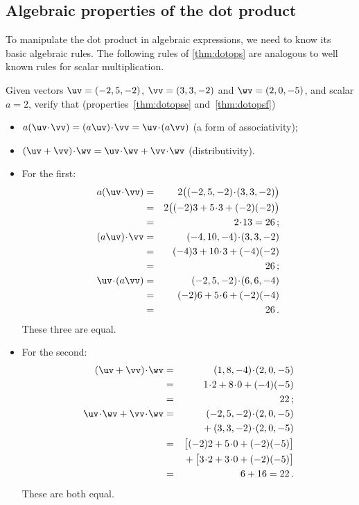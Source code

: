 \subsection{Algebraic properties of the dot product}
\label{sec:apdp}


To manipulate the dot product in algebraic expressions, we need to know its basic algebraic rules.
The following rules of \autoref{thm:dotops} are analogous to well known rules for scalar multiplication.


\begin{example} \label{eg:}
Given vectors \(\uv=(-2,5,-2)\), \(\vv=(3,3,-2)\) and \(\wv=(2,0,-5)\), and  scalar \(a=2\), verify that (properties~\ref{thm:dotopse} and~\ref{thm:dotopsf})
\begin{itemize}
\item \(a(\uv\cdot\vv)=(a\uv)\cdot\vv=\uv\cdot(a\vv)\) (a form of associativity);
\item \((\uv+\vv)\cdot\wv=\uv\cdot\wv+\vv\cdot\wv\) (distributivity).
\end{itemize}
\begin{solution} 
\begin{itemize}
\item For the first:
\begin{eqnarray*}
a(\uv\cdot\vv)&=&2\big((-2,5,-2)\cdot(3,3,-2)\big)
\\&=&2\big((-2)3+5\cdot3+(-2)(-2)\big)
\\&=&2\cdot13=26\,;
\\(a\uv)\cdot\vv&=&(-4,10,-4)\cdot(3,3,-2)
\\&=&(-4)3+10\cdot3+(-4)(-2)
\\&=&26\,;
\\\uv\cdot(a\vv)&=&(-2,5,-2)\cdot(6,6,-4)
\\&=&(-2)6+5\cdot6+(-2)(-4)
\\&=&26\,.
\end{eqnarray*}
These three are equal.

\item For the second:
\begin{eqnarray*}
(\uv+\vv)\cdot\wv&=&(1,8,-4)\cdot(2,0,-5)
\\&=&1\cdot2+8\cdot0+(-4)(-5)
\\&=&22\,;
\\\uv\cdot\wv+\vv\cdot\wv&=&
(-2,5,-2)\cdot(2,0,-5)
\\&&{}
+(3,3,-2)\cdot(2,0,-5)
\\&=&\big[(-2)2+5\cdot0+(-2)(-5)\big]
\\&&{}
+\big[3\cdot2+3\cdot0+(-2)(-5)\big]
\\&=&6+16=22\,.
\end{eqnarray*}
These are both equal.
\end{itemize}
\end{solution}
\end{example}




